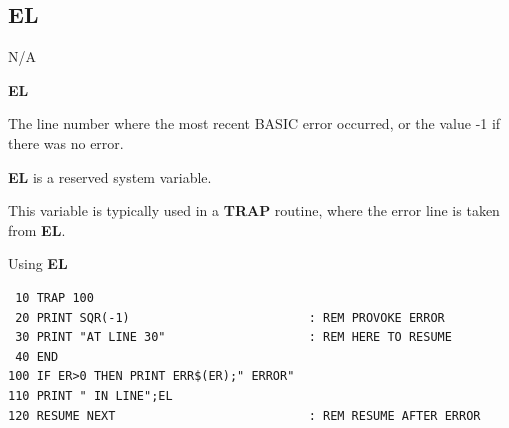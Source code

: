 \subsection{EL}
\begin{description}[leftmargin=2cm,style=nextline]
\item [Token:]    N/A

\item [Format:]   {\bf EL}

\item [Usage:]    The line number where the most recent BASIC error occurred, or the value -1 if there was no error.

\item [Remarks:]  {\bf EL} is a reserved system variable.

                  This variable is typically used in a {\bf TRAP} routine, where the error line is taken from {\bf EL}.

\item [Example:]  Using {\bf EL}

\begin{tcolorbox}[colback=black,coltext=white]
\verbatimfont{\codefont}
\begin{verbatim}
 10 TRAP 100
 20 PRINT SQR(-1)                         : REM PROVOKE ERROR
 30 PRINT "AT LINE 30"                    : REM HERE TO RESUME
 40 END
100 IF ER>0 THEN PRINT ERR$(ER);" ERROR"
110 PRINT " IN LINE";EL
120 RESUME NEXT                           : REM RESUME AFTER ERROR
\end{verbatim}
\end{tcolorbox}
\end{description}


\newpage
